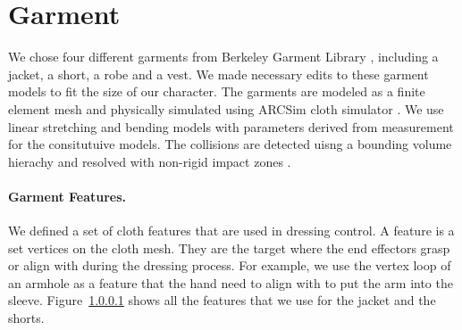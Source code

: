 \section{Garment}

We chose four different garments from Berkeley Garment Library \cite{}, including a jacket, a short, a robe and a vest. We made necessary edits to these garment models to fit the size of our character.
The garments are modeled as a finite element mesh and physically simulated using ARCSim cloth simulator \cite{}. We use linear stretching and bending models with parameters derived from measurement \cite{}  for the consitutuive models. The collisions are detected uisng a bounding volume hierachy \cite{} and resolved with non-rigid impact zones \cite{}.

\paragraph{Garment Features.} We defined a set of cloth features that are used in dressing control. A feature is a set vertices on the cloth mesh. They are the target where the end effectors grasp or align with during the dressing process. For example, we use the vertex loop of an armhole as a feature that the hand need to align with to put the arm into the sleeve. Figure~\ref{} shows all the features that we use for the jacket and the shorts.
